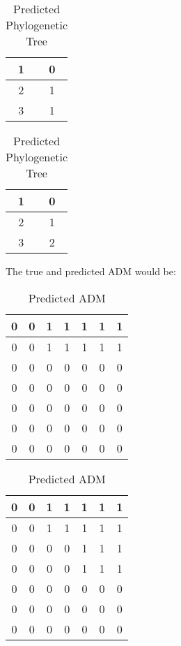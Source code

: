 \documentclass[a4paper, 11pt]{article}
\begin{document}
\begin{table}[ht]
    \parbox{.45\linewidth}{
    \centering
    \begin{tabular}{||c c||}
    \hline
    1 & 0\\
    \hline
    2 & 1\\
    \hline
    3 & 1\\
    \hline
    \end{tabular}
    \caption{True Phylogenetic Tree}
    }
    \hfill
    \parbox{.45\linewidth}{
    \centering
    \begin{tabular}{||c c||}
    \hline
    1 & 0\\
    \hline
    2 & 1\\
    \hline
    3 & 2\\
    \hline
    \end{tabular}
    \caption{Predicted Phylogenetic Tree}
    }
\end{table}


The true and predicted ADM would be:
\begin{table}[ht]
    \parbox{.45\linewidth}{
    \centering
    \begin{tabular}{||c c c c c c c||}
    \hline
    0 & 0 & 1 & 1 & 1 & 1 & 1\\
    \hline
    0 & 0 & 1 & 1 & 1 & 1 & 1\\
    \hline
    0 & 0 & 0 & 0 & 0 & 0 & 0\\
    \hline
    0 & 0 & 0 & 0 & 0 & 0 & 0\\
    \hline
    0 & 0 & 0 & 0 & 0 & 0 & 0\\
    \hline
    0 & 0 & 0 & 0 & 0 & 0 & 0\\
    \hline
    0 & 0 & 0 & 0 & 0 & 0 & 0\\
    \hline
    \end{tabular}
    \caption{True ADM}
    }
    \hfill
    \parbox{.45\linewidth}{
    \centering
    \begin{tabular}{||c c c c c c c||}
    \hline
    0 & 0 & 1 & 1 & 1 & 1 & 1\\
    \hline
    0 & 0 & 1 & 1 & 1 & 1 & 1\\
    \hline
    0 & 0 & 0 & 0 & 1 & 1 & 1\\
    \hline
    0 & 0 & 0 & 0 & 1 & 1 & 1\\
    \hline
    0 & 0 & 0 & 0 & 0 & 0 & 0\\
    \hline
    0 & 0 & 0 & 0 & 0 & 0 & 0\\
    \hline
    0 & 0 & 0 & 0 & 0 & 0 & 0\\
    \hline
    \end{tabular}
    \caption{Predicted ADM}
    }
\end{table}
\end{document}
